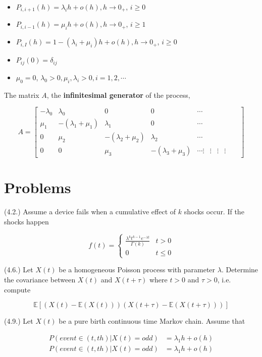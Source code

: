 \documentclass[12pt]{article}
\theoremstyle{nonumberbreak}
\begin{document}
\begin{itemize}
	\item $P_{i, i+1}(h) = \lambda_i h + o(h), h \to 0_+$, $i \ge 0$
	\item $P_{i, i-1}(h) = \mu_i h + o(h), h \to 0_+$, $i \ge 1$
	\item $P_{i,I} (h) = 1 -(\lambda_i + \mu_i) h + o(h), h \to 0_+$, $i \ge 0$
	\item $P_{ij} (0) = \delta_{ij}$
	\item $\mu_0 = 0$, $\lambda_0 > 0, \mu_i, \lambda_i > 0, i=1,2,\cdots$
\end{itemize}

The matrix $A$, the \textbf{infinitesimal generator} of the process,

$$
A = \begin{bmatrix}
-\lambda_0 & \lambda_0 & 0 & 0 & \cdots \\
\mu_1 & -(\lambda_1 + \mu_1)  & \lambda_1 & 0 & \cdots \\
0 & \mu_2 & -(\lambda_2 + \mu_2) & \lambda_2 & \cdots \\
0 & 0 & \mu_3 & -(\lambda_3 + \mu_3) & \cdots
\vdots & \vdots &  \vdots &  \vdots &   & 
\end{bmatrix}
$$


\section{Problems}

(4.2.) Assume a device fails when a cumulative effect of $k$ shocks occur. If the shocks happen 

$$
f(t) = \begin{cases}
\frac{\lambda^k t^{k-1} e^{-\lambda t}}{\Gamma(k)} & t>0 \\[8pt]
0 & t \le 0
\end{cases}
$$


(4.6.) Let $X(t)$ be a homogeneous Poisson process with parameter $\lambda$. Determine the covariance between $X(t)$ and $X(t + \tau)$ where $t > 0$ and $\tau > 0$, i.e. compute

$$
\mathbb{E} \left[ \left( X(t) - \mathbb{E}(X(t)) \right) \left( X(t+\tau) - \mathbb{E}(X(t+\tau)) \right) \right]
$$



(4.9.) Let $X(t)$ be a pure birth continuous time Markov chain. Assume that 

$$
\begin{aligned}
P(event \in (t, th) | X(t) = odd) &= \lambda_1 h + o(h) \\[8pt]
P(event \in (t, th) | X(t) = odd) &= \lambda_1 h + o(h) \\[8pt]
\end{aligned}
$$
\end{document}
